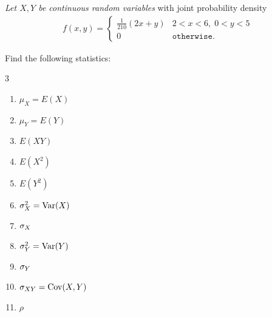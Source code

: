  \begin{ejemplo}
  \label{exmp:2.9.6}
  \emph{Let $X,Y$ be continuous random variables} with joint probability density
  \begin{align}f(x,y)=
   \begin{cases}
    \frac{1}{210}(2x+y) & 2 < x < 6,\; 0<y<5 \\
    0 & \texttt{otherwise}.
   \end{cases}
  \end{align}
 \end{ejemplo}

Find the following statistics:
\begin{multicols}{3}
 \begin{enumerate}
 \item $\mu_X = E(X)$ %
 \item $\mu_Y = E(Y)$ %
 \item $ E(XY)$ %
 \item $E(X^2)$ %
 \item $E(Y^2)$ %
 \item $\sigma^2_X = \operatorname{Var}(X)$ %
 \item $\sigma_{X}$
 \item $\sigma^2_Y = \operatorname{Var}(Y)$ %
 \item $\sigma_{Y}$
 \item $\sigma_{XY} =\operatorname{Cov}(X,Y)$ %
 \item $\rho$
\end{enumerate}
\end{multicols}
